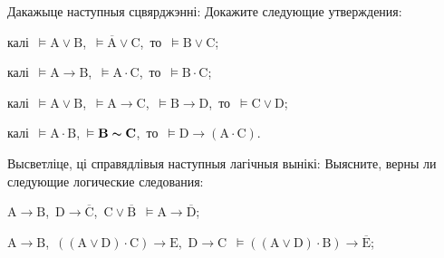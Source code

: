 \begin{problemList}
{\begin{belarusianEnumerate}
\end{belarusianEnumerate}
}

\smallskip

\problemItemWithCommonPart
{Дакажыце наступныя сцвярджэнні:}
{Докажите следующие утверждения:}
{%
\begin{belarusianEnumerate}

\item калі\, $\vDash \boldsymbol{\mathrm{A}} \vee \boldsymbol{\mathrm{B}}$,\,
$\vDash \overline{\boldsymbol{\mathrm{A}}} \vee \boldsymbol{\mathrm{C}}$,\,
то\, $\vDash \boldsymbol{\mathrm{B}} \vee \boldsymbol{\mathrm{C}}$;

\item калі\, $\vDash \boldsymbol{\mathrm{A}} \to \boldsymbol{\mathrm{B}}$,\,
$\vDash \boldsymbol{\mathrm{A}} \cdot \boldsymbol{\mathrm{C}}$,\, то\,
$\vDash \boldsymbol{\mathrm{B}} \cdot \boldsymbol{\mathrm{C}}$;

\item калі\, $\vDash \boldsymbol{\mathrm{A}} \vee \boldsymbol{\mathrm{B}}$,\,
$\vDash \boldsymbol{\mathrm{A}} \to \boldsymbol{\mathrm{C}}$,\,
$\vDash \boldsymbol{\mathrm{B}} \to \boldsymbol{\mathrm{D}}$,\, то\,
$\vDash \boldsymbol{\mathrm{C}} \vee \boldsymbol{\mathrm{D}}$;

\item калі\, $\vDash \boldsymbol{\mathrm{A}} \cdot \boldsymbol{\mathrm{B}}$,\,
$\vDash \boldsymbol{\mathrm{B}} \thicksim \boldsymbol{\mathrm{C}}$,\, то\,
$\vDash \boldsymbol{\mathrm{D}} \to (\boldsymbol{\mathrm{A}} \cdot \boldsymbol{\mathrm{C}})$.

\end{belarusianEnumerate}
}

\smallskip

\problemItemWithCommonPart
{Высветліце, ці справядлівыя наступныя лагічныя вынікі:}
{Выясните, верны ли следующие логические следования:}
{%
\begin{belarusianEnumerate}
	
\item $\boldsymbol{\mathrm{A}} \to \boldsymbol{\mathrm{B}}$,\,
$\boldsymbol{\mathrm{D}} \to \overline{\boldsymbol{\mathrm{C}}}$,\,
$\boldsymbol{\mathrm{C}} \vee \overline{\boldsymbol{\mathrm{B}}}$\,
$\vDash \boldsymbol{\mathrm{A}} \to \overline{\boldsymbol{\mathrm{D}}}$;

\item $\boldsymbol{\mathrm{A}} \to \boldsymbol{\mathrm{B}}$,\, $((\boldsymbol{\mathrm{A}}
\vee \boldsymbol{\mathrm{D}}) \cdot \boldsymbol{\mathrm{C}}) \to \boldsymbol{\mathrm{E}}$,\,
$\boldsymbol{\mathrm{D}} \to \boldsymbol{\mathrm{C}}$\, $\vDash ((\boldsymbol{\mathrm{A}} \vee \boldsymbol{\mathrm{D}}) \cdot \boldsymbol{\mathrm{B}}) \to \overline{\boldsymbol{\mathrm{E}}}$;


\end{belarusianEnumerate}}
\end{problemList}
